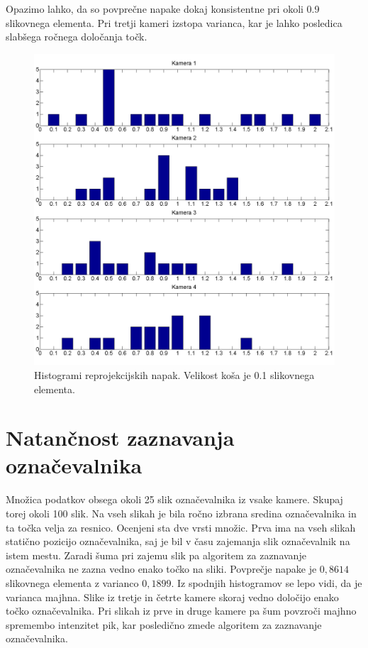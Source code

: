 \documentclass[a4paper, 12pt]{book}
\begin{document}
Opazimo lahko, da so povprečne napake dokaj konsistentne pri okoli 0.9 slikovnega elementa. Pri tretji kameri izstopa varianca, kar je lahko posledica slabšega ročnega določanja točk.

\begin{figure}[H]
\centering
\includegraphics[width=\textwidth,height=\textheight,keepaspectratio]{reprojected_bar.png}
\caption{Histogrami reprojekcijskih napak. Velikost koša je 0.1 slikovnega elementa.}
\end{figure}

\section{Natančnost zaznavanja označevalnika}
Množica podatkov obsega okoli 25 slik označevalnika iz vsake kamere. Skupaj torej okoli 100 slik. Na vseh slikah je bila ročno izbrana sredina označevalnika in ta točka velja za resnico. Ocenjeni sta dve vrsti množic. Prva ima na vseh slikah statično pozicijo označevalnika, saj je bil v času zajemanja slik označevalnik na istem mestu. Zaradi šuma pri zajemu slik pa algoritem za zaznavanje označevalnika ne zazna vedno enako točko na sliki. Povprečje napake je $0,8614$ slikovnega elementa z varianco $0,1899$. Iz spodnjih histogramov se lepo vidi, da je varianca majhna. Slike iz tretje in četrte kamere skoraj vedno določijo enako točko označevalnika. Pri slikah iz prve in druge kamere pa šum povzroči majhno spremembo intenzitet pik, kar posledično zmede algoritem za zaznavanje označevalnika.
\end{document}
